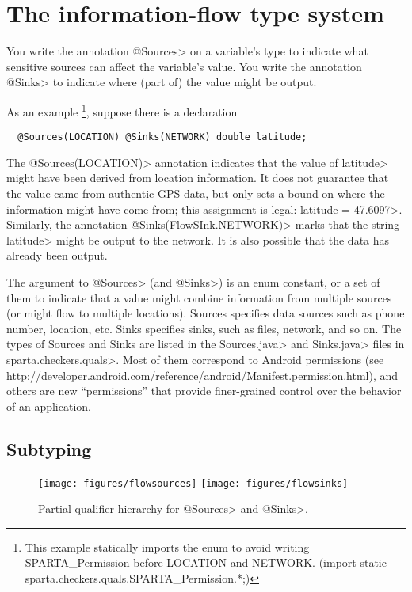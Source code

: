 \section{The information-flow type system\label{sec:flow-type-system}}

You write the annotation \<@Sources> on a variable's
type to indicate what sensitive sources can affect the variable's value.
You write the annotation \<@Sinks> to indicate where (part of) the
value might be output.

As an example
\footnote{This example statically imports the enum to avoid writing SPARTA\_Permission before LOCATION and NETWORK. (import static sparta.checkers.quals.SPARTA\_Permission.*;)}, suppose there is a declaration
\begin{Verbatim}
  @Sources(LOCATION) @Sinks(NETWORK) double latitude;
\end{Verbatim}
\noindent
The \<@Sources(LOCATION)> annotation indicates that the
value of \<latitude> might have been derived from
location information.  It does not guarantee that the value came from
authentic GPS data, but only sets a bound on where the information might
have come from; this assignment is legal: \<latitude = 47.6097>.
Similarly, the annotation \<@Sinks(FlowSInk.NETWORK)> marks that
the string \<latitude> might be output to the network.  It is also
possible that the data has already been output.

The argument to \<@Sources> (and \<@Sinks>) is an enum constant, or a
set of them to indicate that a value might combine information from
multiple sources (or might flow to multiple locations).
Sources specifies data sources such as phone number, location, 
etc.  Sinks specifies sinks, such as files, network, and so on.
The types of Sources and Sinks are listed in the
\<Sources.java> and \<Sinks.java> files in \<sparta.checkers.quals>.
Most of them correspond to Android permissions (see 
\url{http://developer.android.com/reference/android/Manifest.permission.html}),
and others are new ``permissions'' that provide finer-grained control over
the behavior of an application.


\subsection{Subtyping\label{sec:subtyping}}

\begin{figure}
\centerline{\texttt{[image: figures/flowsources]}%
  \hfill%
  \texttt{[image: figures/flowsinks]}}
\caption{Partial qualifier hierarchy for \<@Sources> and \<@Sinks>.}
\label{fig:flow-hierarchy}
\end{figure}

